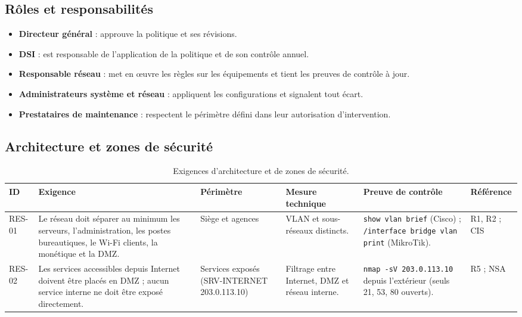 \documentclass[11pt,a4paper]{article}
\begin{document}
	\subsection{Rôles et responsabilités}
	
	\begin{itemize}
		\item \textbf{Directeur général} : approuve la politique et ses révisions.
		\item \textbf{DSI} : est responsable de l'application de la politique et de son contrôle annuel.
		\item \textbf{Responsable réseau} : met en œuvre les règles sur les équipements et tient les preuves de contrôle à jour.
		\item \textbf{Administrateurs système et réseau} : appliquent les configurations et signalent tout écart.
		\item \textbf{Prestataires de maintenance} : respectent le périmètre défini dans leur autorisation d'intervention.
	\end{itemize}
	
	\subsection{Architecture et zones de sécurité}
	
	\scriptsize
	\begin{longtable}{p{0.7cm} p{3.95cm} p{1.95cm} p{3.2cm} p{3.0cm} p{1.8cm}}
		\caption{Exigences d'architecture et de zones de sécurité.}\\
		\hline
		\textbf{ID} & \textbf{Exigence} & \textbf{Périmètre} & \textbf{Mesure technique} & \textbf{Preuve de contrôle} & \textbf{Référence}\\
		\hline
		\endhead
		RES-01 & Le réseau doit séparer au minimum les serveurs, l'administration, les postes bureautiques, le Wi-Fi clients, la monétique et la DMZ. & Siège et agences & VLAN et sous-réseaux distincts. & \texttt{show vlan brief} (Cisco) ; \texttt{/interface bridge vlan print} (MikroTik). & R1, R2 ; CIS\\
		\hline
		RES-02 & Les services accessibles depuis Internet doivent être placés en DMZ ; aucun service interne ne doit être exposé directement. & Services exposés (SRV-INTERNET 203.0.113.10) & Filtrage entre Internet, DMZ et réseau interne. & \texttt{nmap -sV 203.0.113.10} depuis l'extérieur (seuls 21, 53, 80 ouverts). & R5 ; NSA\\
		\hline
	\end{longtable}
	\normalsize
	
\end{document}
